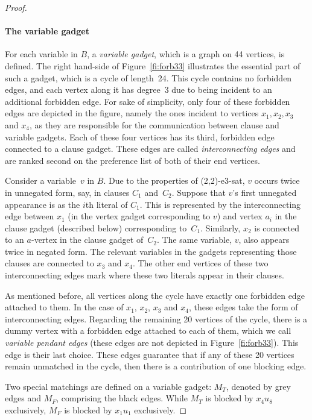 \documentclass[preprint,12pt]{elsarticle}
\begin{document}
\begin{proof}
\paragraph{The variable gadget} For each variable in $B$, a \emph{variable gadget}, which is a graph on 44 vertices, is defined. The right hand-side of Figure~\ref{fi:forb33} illustrates the essential part of such a gadget, which is a cycle of length~24. This cycle contains no forbidden edges, and each vertex along it has degree~3 due to being incident to an additional forbidden edge. For sake of simplicity, only four of these forbidden edges are depicted in the figure, namely the ones incident to vertices $x_1, x_2, x_3$ and $x_4$, as they are responsible for the communication between clause and variable gadgets. Each of these four vertices has its third, forbidden edge connected to a clause gadget. These edges are called \emph{interconnecting edges} and are ranked second on the preference list of both of their end vertices.
	
	Consider a variable~$v$ in $B$. Due to the properties of {\sc (2,2)-e3-sat}, $v$ occurs twice in unnegated form, say, in clauses $C_1$ and~$C_2$.  Suppose that $v$'s first unnegated appearance is as the $i$th literal of $C_1$.  This is represented by the interconnecting edge between $x_1$ (in the vertex gadget corresponding to $v$) and vertex $a_i$ in the clause gadget (described below) corresponding to~$C_1$. Similarly, $x_2$ is connected to an $a$-vertex in the clause gadget of~$C_2$. The same variable, $v$, also appears twice in negated form. The relevant variables in the gadgets representing those clauses are connected to $x_3$ and $x_4$. The other end vertices of these two interconnecting edges mark where these two literals appear in their clauses.
	
	As mentioned before, all vertices along the cycle have exactly one forbidden edge attached to them. In the case of $x_1$, $x_2$, $x_3$ and $x_4$, these edges take the form of interconnecting edges.  Regarding the remaining 20 vertices of the cycle, there is a dummy vertex with a forbidden edge attached to each of them, which we call \emph{variable pendant edges} (these edges are not depicted in Figure~\ref{fi:forb33}). This edge is their last choice. These edges guarantee that if any of these 20 vertices remain unmatched in the cycle, then there is a contribution of one blocking edge.
	
	Two special matchings are defined on a variable gadget: $M_T$, denoted by grey edges and $M_F$, comprising the black edges. While $M_T$ is blocked by $x_4u_8$ exclusively, $M_F$ is blocked by $x_1u_1$ exclusively.
	

\end{proof}
\end{document}
